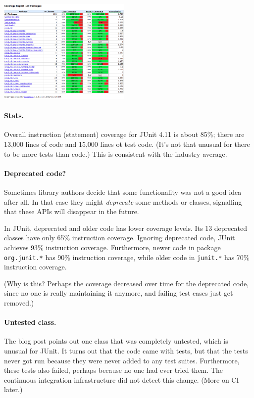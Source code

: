 \documentclass[11pt]{article}
\begin{document}
\begin{center}
  \includegraphics[height=2in]{L14/cobertura-junit.png}
\end{center}

\paragraph{Stats.} Overall instruction (statement) coverage for JUnit 4.11 is about 85\%; there are
13,000 lines of code and 15,000 lines ot test code. (It's not that
unusual for there to be more tests than code.) This is consistent with
the industry average.

\paragraph{Deprecated code?} Sometimes library authors decide that some functionality
was not a good idea after all. In that case they might \emph{deprecate} some methods or
classes, signalling that these APIs will disappear in the future.

In JUnit, deprecated and older code has lower coverage levels. Its 13 deprecated
classes have only 65\% instruction coverage. Ignoring deprecated code, JUnit achieves
93\% instruction coverage. Furthermore, newer code in
package {\tt org.junit.*} has 90\% instruction coverage, while older code in
{\tt junit.*} has 70\% instruction coverage.

(Why is this? Perhaps the coverage decreased over time for the deprecated code, since
no one is really maintaining it anymore, and failing test cases just get removed.)

\paragraph{Untested class.} The blog post points out one class that was completely
untested, which is unusual for JUnit. It turns out that the code came with tests,
but that the tests never got run because they were never added to any test suites.
Furthermore, these tests also failed, perhaps because no one had ever tried them.
The continuous integration infrastructure did not detect this change. (More on CI
later.)
\end{document}
